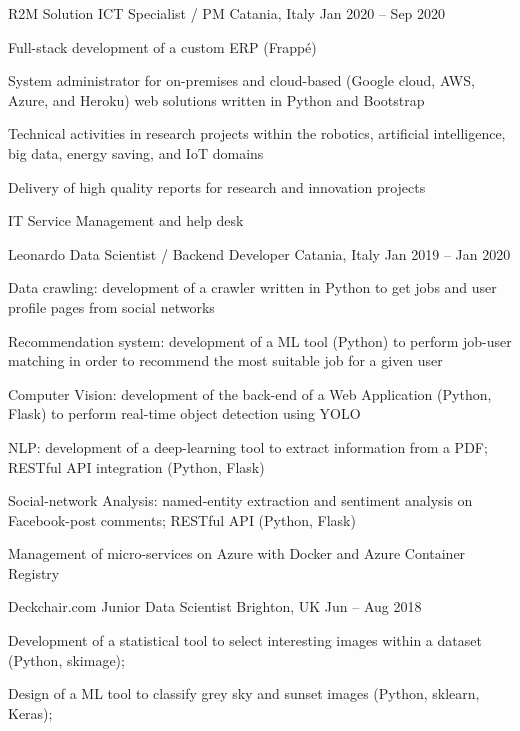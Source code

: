 \begin{cventries}
    \cventry
    {R2M Solution}    
    {ICT Specialist / PM}
    {Catania, Italy}
    {Jan 2020 -- Sep 2020}
    {
      \begin{cvitems}
        \item {Full-stack development of a custom ERP (Frappé)}
        \item {System administrator for on-premises and cloud-based (Google cloud, AWS, Azure, and Heroku) web solutions written in Python and Bootstrap}
        \item {Technical activities in research projects within the robotics, artificial intelligence, big data, energy saving, and IoT domains}
        \item {Delivery of high quality reports for research and innovation projects}
        \item {IT Service Management and help desk}
      \end{cvitems}
    }


    \cventry
    {Leonardo}    
    {Data Scientist / Backend Developer}
    {Catania, Italy}
    {Jan 2019 -- Jan 2020}
    {
      \begin{cvitems}
        \item {Data crawling: development of a crawler written in Python to get jobs and user profile pages from social networks}
        \item {Recommendation system: development of a ML tool (Python) to perform job-user matching in order to recommend the most suitable job for a given user}
        \item {Computer Vision: development of the back-end of a Web Application (Python, Flask) to perform real-time object detection using YOLO}
        \item {NLP: development of a deep-learning tool to extract information from a PDF; RESTful API integration (Python, Flask)}
        \item {Social-network Analysis: named-entity extraction and sentiment analysis on Facebook-post comments; RESTful API (Python, Flask)}
        \item {Management of micro-services on Azure with Docker and Azure Container Registry}
      \end{cvitems}
    }

    \cventry
    {Deckchair.com}
    {Junior Data Scientist}
    {Brighton, UK}
    {Jun -- Aug 2018}
    {
      \begin{cvitems}
        \item Development of a statistical tool to select interesting images within a dataset (Python, skimage);
        \item Design of a ML tool to classify grey sky and sunset images (Python, sklearn, Keras);
      \end{cvitems}
    }
  \end{cventries}

